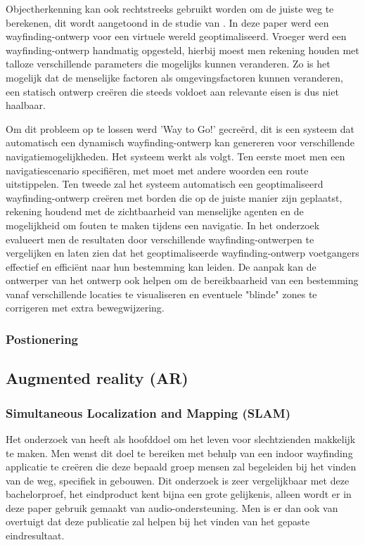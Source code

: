 Objectherkenning kan ook rechtstreeks gebruikt worden om de juiste weg te berekenen, dit wordt aangetoond in de studie van \autocite{Haikun2017}. In deze paper werd een wayfinding-ontwerp voor een virtuele wereld geoptimaliseerd. Vroeger werd een wayfinding-ontwerp handmatig opgesteld, hierbij moest men rekening houden met talloze verschillende parameters die mogelijks kunnen veranderen. Zo is het mogelijk dat de menselijke factoren als omgevingsfactoren  kunnen veranderen, een statisch ontwerp creëren die steeds voldoet aan relevante eisen is dus niet haalbaar.

Om dit probleem op te lossen werd 'Way to Go!' gecreërd, dit is een systeem dat automatisch een dynamisch wayfinding-ontwerp kan genereren voor verschillende navigatiemogelijkheden. Het systeem werkt als volgt. Ten eerste moet men een navigatiescenario specifiëren, met moet met andere woorden een route uitstippelen. Ten tweede zal het systeem automatisch een geoptimaliseerd wayfinding-ontwerp creëren met borden die op de juiste manier zijn geplaatst, rekening houdend met de zichtbaarheid van menselijke agenten en de mogelijkheid om fouten te maken tijdens een navigatie.  In het onderzoek evalueert men de resultaten door verschillende wayfinding-ontwerpen te vergelijken en laten zien dat het geoptimaliseerde wayfinding-ontwerp voetgangers effectief en efficiënt naar hun bestemming kan leiden. De aanpak kan de ontwerper van het ontwerp ook helpen om de bereikbaarheid van een bestemming vanaf verschillende locaties te visualiseren en eventuele "blinde" zones te corrigeren met extra bewegwijzering.

\subsubsection{Postionering}
 
\subsection{Augmented reality (AR)}

\subsubsection{Simultaneous Localization and Mapping (SLAM)}
Het onderzoek van \autocite{Zhang2017} heeft als hoofddoel om het leven voor slechtzienden makkelijk te maken. Men wenst dit doel te bereiken met behulp van een indoor wayfinding applicatie te creëren die deze bepaald groep mensen zal begeleiden bij het vinden van de weg, specifiek in gebouwen. Dit onderzoek is zeer vergelijkbaar met deze bachelorproef, het eindproduct kent bijna een grote gelijkenis, alleen wordt er in deze paper gebruik gemaakt van audio-ondersteuning. Men is er dan ook van overtuigt dat deze publicatie zal helpen bij het vinden van het gepaste eindresultaat.

